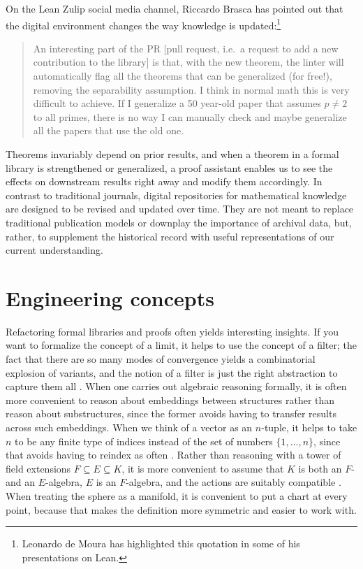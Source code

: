 \documentclass{amsart}
\theoremstyle{definition}
\theoremstyle{remark}
\numberwithin{equation}{section}
\begin{document}
On the Lean Zulip social media channel, Riccardo Brasca has pointed out that the digital environment changes the way knowledge is updated:\footnote{Leonardo de Moura has highlighted this quotation in some of his presentations on Lean.}
\begin{quote}
  An interesting part of the PR [pull request, i.e.~a request to add a new contribution to the library] is that, with the new theorem, the linter will automatically flag all the theorems that can be generalized (for free!), removing the separability assumption. I think in normal math this is very difficult to achieve. If I generalize a 50 year-old paper that assumes $p \ne 2$ to all primes, there is no way I can manually check and maybe generalize all the papers that use the old one.
\end{quote}
Theorems invariably depend on prior results, and when a theorem in a formal library is strengthened or generalized, a proof assistant enables us to see the effects on downstream results right away and modify them accordingly. In contrast to traditional journals, digital repositories for mathematical knowledge are designed to be revised and updated over time. They are not meant to replace traditional publication models or downplay the importance of archival data, but, rather, to supplement the historical record with useful representations of our current understanding.


\section{Engineering concepts}

Refactoring formal libraries and proofs often yields interesting insights. If you want to formalize the concept of a limit, it helps to use the concept of a filter; the fact that there are so many modes of convergence yields a combinatorial explosion of variants, and the notion of a filter is just the right abstraction to capture them all \cite{holzl:et:al:13}. When one carries out algebraic reasoning formally, it is often more convenient to reason about embeddings between structures rather than reason about substructures, since the former avoids having to transfer results across such embeddings. When we think of a vector as an $n$-tuple, it helps to take $n$ to be any finite type of indices instead of the set of numbers $\{1, \ldots, n\}$, since that avoids having to reindex as often \cite{mathlib:20}. Rather than reasoning with a tower of field extensions $F \subseteq E \subseteq K$, it is more convenient to assume that $K$ is both an $F$- and an $E$-algebra, $E$ is an $F$-algebra, and the actions are suitably compatible \cite{baanen:et:al:22}. When treating the sphere as a manifold, it is convenient to put a chart at every point, because that makes the definition more symmetric and easier to work with.
\end{document}
